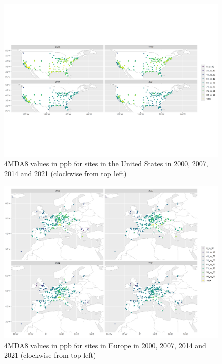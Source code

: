 \documentclass[journal abbreviation, manuscript]{copernicus}
\begin{document}
\begin{figure}[t]
\includegraphics[width=12cm]{plots/mda8_4MDA8_USA_2000_07_14_21_map.png}
\caption{4MDA8 values in ppb for sites in the United States in 2000, 2007, 2014 and 2021 (clockwise from top left)}
\label{us_4mda8_map}
\end{figure}

\begin{figure}[t]
\includegraphics[width=12cm]{plots/mda8_4MDA8_EU_2000_07_14_21_map.png}
\caption{4MDA8 values in ppb for sites in Europe in 2000, 2007, 2014 and 2021 (clockwise from top left)}
\label{eu_4mda8_map}
\end{figure}
\end{document}
